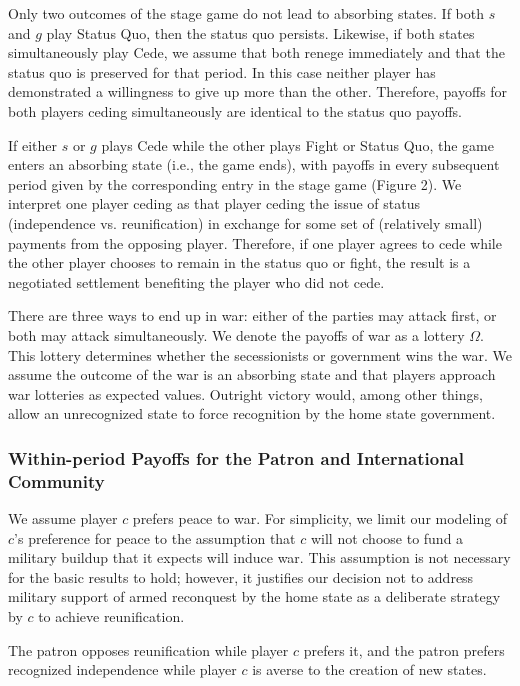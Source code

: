 Only two outcomes of the stage game do not lead to absorbing states. If both $s$ and $g$ play Status Quo, then the status quo persists. Likewise, if both states simultaneously play Cede, we assume that both renege immediately and that the status quo is preserved for that period. In this case neither player has demonstrated a willingness to give up more than the other. Therefore, payoffs for both players ceding simultaneously are identical to the status quo payoffs.

If either $s$ or $g$ plays Cede while the other plays Fight or Status Quo, the game enters an absorbing state (i.e., the game ends), with payoffs in every subsequent period given by the corresponding entry in the stage game (Figure 2). We interpret one player ceding as that player ceding the issue of status (independence vs. reunification) in exchange for some set of (relatively small) payments from the opposing player. Therefore, if one player agrees to cede while the other player chooses to remain in the status quo or fight, the result is a negotiated settlement benefiting the player who did not cede. 

There are three ways to end up in war: either of the parties may attack first, or both may attack simultaneously. We denote the payoffs of war as a lottery $\Omega$. This lottery determines whether the secessionists or government wins the war. We assume the outcome of the war is an absorbing state and that players approach war lotteries as expected values. Outright victory would, among other things, allow an unrecognized state to force recognition by the home state government.


\subsubsection{Within-period Payoffs for the Patron and International Community}
We assume player $c$ prefers peace to war. For simplicity, we limit our modeling of $c$'s preference for peace to the assumption that $c$ will not choose to fund a military buildup that it expects will induce war. This assumption is not necessary for the basic results to hold; however, it justifies our decision not to address military support of armed reconquest by the home state as a deliberate strategy by $c$ to achieve reunification. 

The patron opposes reunification while player $c$ prefers it, and the patron prefers recognized independence while player $c$ is averse to the creation of new states.



